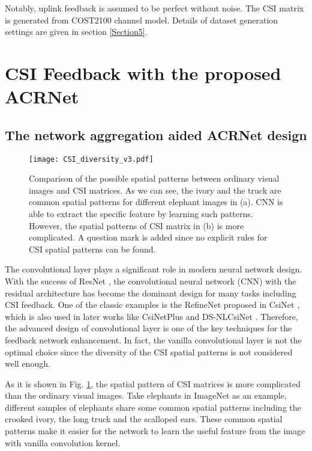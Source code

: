 \documentclass[12pt, draftclsnofoot, onecolumn]{IEEEtran}
\begin{document}
Notably, uplink feedback is assumed to be perfect without noise. The CSI matrix is generated from COST2100 \cite{liu2012cost} channel model. Details of dataset generation settings are given in section \ref{Section5}.

\section{CSI Feedback with the proposed ACRNet} \label{Section3}

\subsection{The network aggregation aided ACRNet design} \label{Section3-1}

\begin{figure}[!b]
\centering
\texttt{[image: CSI\_diversity\_v3.pdf]}
\caption{Comparison of the possible spatial patterns between ordinary visual images and CSI matrices. As we can see, the ivory and the truck are common spatial patterns for different elephant images in (a). CNN is able to extract the specific feature by learning such patterns. However, the spatial patterns of CSI matrix in (b) is more complicated. A question mark is added since no explicit rules for CSI spatial patterns can be found.}
\label{CSI Diversity}
\end{figure}

The convolutional layer plays a significant role in modern neural network design. With the success of ResNet \cite{he2016deep}, the convolutional neural network (CNN) with the residual architecture has become the dominant design for many tasks including CSI feedback. One of the classic examples is the RefineNet proposed in CsiNet \cite{wen2018deep}, which is also used in later works like CsiNetPlus \cite{guo2020convolutional} and DS-NLCsiNet \cite{yu2020ds}. Therefore, the advanced design of convolutional layer is one of the key techniques for the feedback network enhancement. In fact, the vanilla convolutional layer is not the optimal choice since the diversity of the CSI spatial patterns is not considered well enough.

As it is shown in Fig. \ref{CSI Diversity}, the spatial pattern of CSI matrices is more complicated than the ordinary visual images. Take elephants in ImageNet \cite{deng2009imagenet} as an example, different samples of elephants share some common spatial patterns including the crooked ivory, the long truck and the scalloped ears. These common spatial patterns make it easier for the network to learn the useful feature from the image with vanilla convolution kernel.
\end{document}
